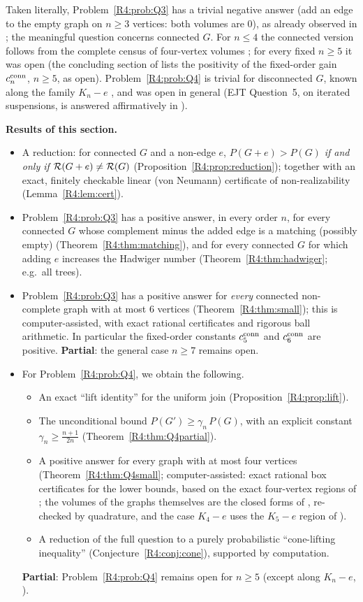 \documentclass[11pt]{amsart}
\theoremstyle{definition}
\theoremstyle{remark}
\begin{document}
Taken literally, Problem~\ref{R4:prob:Q3} has a trivial negative answer
(add an edge to the empty graph on $n\ge3$ vertices: both volumes are
$0$), as already observed in \cite{K-015}; the meaningful question
concerns connected $G$.  For $n\le4$ the connected version follows from
the complete census of four-vertex volumes
\cite{R4-EJT,R4-FGL,K-015}; for every fixed $n\ge5$ it was open
(the concluding section of \cite{K-015} lists the positivity of the
fixed-order gain $c_n^{\rm conn}$, $n\ge5$, as open).  Problem~\ref{R4:prob:Q4} is trivial
for disconnected $G$, known along the family $K_n-e$
\cite{K-015}, and was open in general (EJT Question~5, on iterated
suspensions, is answered affirmatively in \cite{K-015}).

\medskip\noindent\textbf{Results of this section.}
\begin{itemize}
\item[(a)] A reduction: for connected $G$ and a non-edge $e$,
$P(G+e)>P(G)$ \emph{if and only if} $\mathcal{R}(G+e)\neq\mathcal{R}(G)$
(Proposition~\ref{R4:prop:reduction}); together with an exact,
finitely checkable linear (von Neumann) certificate of non-realizability
(Lemma~\ref{R4:lem:cert}).
\item[(b)] Problem~\ref{R4:prob:Q3} has a positive answer, in every order
$n$, for every connected $G$ whose complement minus the added edge is a
matching (possibly empty) (Theorem~\ref{R4:thm:matching}), and for every
connected $G$ for which adding $e$ increases the Hadwiger number
(Theorem~\ref{R4:thm:hadwiger}; e.g.\ all trees).
\item[(c)] Problem~\ref{R4:prob:Q3} has a positive answer for
\emph{every} connected non-complete graph with at most $6$ vertices
(Theorem~\ref{R4:thm:small}); this is computer-assisted, with exact
rational certificates and rigorous ball arithmetic.  In particular the
fixed-order constants $c^{\rm conn}_5$ and $c^{\rm conn}_6$ are
positive.  \textbf{Partial}: the general case $n\ge7$ remains open.
\item[(d)] For Problem~\ref{R4:prob:Q4}, we obtain the following.
\begin{itemize}
\item An exact ``lift identity'' for the uniform join
(Proposition~\ref{R4:prop:lift}).
\item The unconditional bound $P(G')\ge\gamma_n\,P(G)$, with an explicit
constant $\gamma_n\ge\frac{n+1}{2n}$ (Theorem~\ref{R4:thm:Q4partial}).
\item A positive answer for every graph with at most four vertices
(Theorem~\ref{R4:thm:Q4small}; computer-assisted: exact rational box
certificates for the lower bounds, based on the exact four-vertex regions
of \cite{R4-EJT}; the volumes of the graphs themselves are the closed forms
of \cite{K-015}, re-checked by quadrature, and the case $K_4-e$ uses the
$K_5-e$ region of \cite{K-015}).
\item A reduction of the full question to a purely probabilistic
``cone-lifting inequality'' (Conjecture~\ref{R4:conj:cone}), supported by
computation.
\end{itemize}
\textbf{Partial}: Problem~\ref{R4:prob:Q4} remains open for $n\ge5$
(except along $K_n-e$, \cite{K-015}).
\end{itemize}
\end{document}
